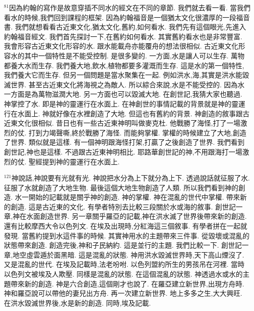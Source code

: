 \documentclass{book}
\begin{document}
$^{81}$因為約翰的寫作是故意穿插不同水的經文在不同的章節.
我們就去看一看.
當我們看水的時候,我們回到課程的框架.
因為約翰福音是一個猶太文化很濃厚的一段福音書.
我們就想看看古近東文化,猶太文化,舊約,如何看水.
我們先有這個眼光,先進入約翰福音經文.
我們首先探討一下,在舊約如何看水.
其實舊約看水也是非常豐富.
我會形容古近東文化形容的水.
跟水能載舟亦能覆舟的想法很相似.
古近東文化形容水的其中一個特性是不能受控制.
是很多變的.
一方面,水是讓人可以生存.
萬物都養大水而生存.
我們養大地,飲水,植物都要多灌溉而生存.
這是水的第一個特性,我們養大它而生存.
但另一個問題是當水聚集在一起.
例如洪水,海,其實是洪水能毀滅世界.
甚至古近東文化將海視之為敵人.
所以綜合來說,水是不能受控的.
因為水一方面是為萬物滋潤大地.
另一方面也可以毀滅大地.
在創世記,我猜大家也聽過.
神掌控了水.
即是神的靈運行在水面上.
在神創世的事情記載的背景就是神的靈運行在水面上.
神就好像在水裡創造了大地.
但這也有舊約的背景.
神創造的敘事跟古近東文化很相似.
昔日也有一些古近東神明叫做麥克杜.
他戰勝了海怪,打了一場激烈的仗.
打到力竭聲嘶,終於戰勝了海怪.
而能夠掌權.
掌權的時候建立了大地,創造了世界.
類似就是這樣.
有一個神明跟海怪打架,打贏了之後創造了世界.
我們看到創世記,神也是這樣.
不過跟古近東神明相比.
耶路華創世記的神,不用跟海打一場激烈的仗.
聖經提到神的靈運行在水面上.

$^{121}$神說話,神說要有光就有光.
神說把水分為上下就分為上下.
透過說話就征服了水.
征服了水就創造了大地生物.
最後這個大地生物創造了人類.
所以我們看到神的創造.
水一開始的記載就是關乎神的創造.
神的掌權.
神在混亂的世代中掌權.
帶來新的創造.
這是古近東的文化.
有學者特別去比較三段關於水或海的敘事.
創世記一章,神在水面創造世界.
另一章關乎羅亞的記載,神在洪水滅了世界後帶來新的創造.
還有比較摩西大令以色列文.
在埃及出現時,分紅海這三個敘事.
有學者拼在一起就發現.
當舊約提到水這件事的時候.
其實神用水的主題帶來三件事.
從毀壞或混亂的狀態帶來創造.
創造完後,神和子民納約.
這是並行的主題.
我們比較一下.
創世記一章,地空虛雲遁於面黑暗.
這是混亂的狀態.
神用洪水毀滅世界時,天下高山煙沒了.
又是混亂的世代.
在埃及記載時,法老吩咐.
以色列盟約所生的男孩吊在河裡.
當時以色列文被埃及人欺壓.
同樣是混亂的狀態.
在這個混亂的狀態.
神透過水或水的主題帶來新的創造.
神是六合創造,這個剛才也說了.
在羅亞建立新世界,出現方舟時.
神和羅亞說可以帶他的妻兒出方舟.
再一次建立新世界.
地上多多之生,大大興旺.
在洪水毀滅世界後,水是新的創造.
同時,埃及記載.
\end{document}
